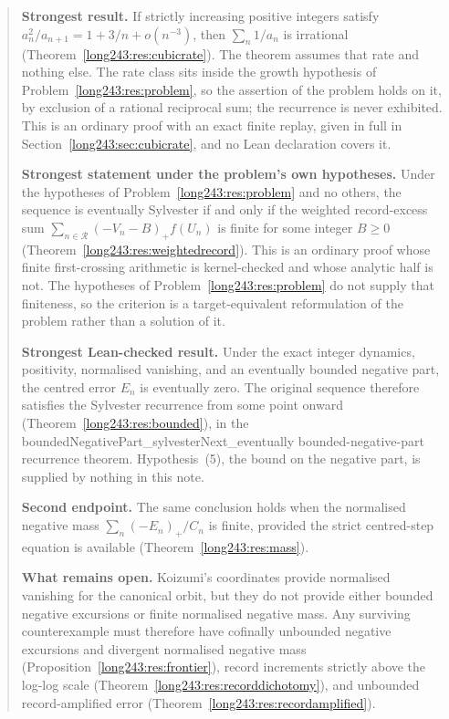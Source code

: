 \begin{quote}\small
\textbf{Strongest result.}
If strictly increasing positive integers satisfy
$a_n^2/a_{n+1}=1+3/n+o(n^{-3})$, then $\sum_n1/a_n$ is irrational
(Theorem~\ref{long243:res:cubicrate}).  The theorem assumes that rate and nothing else.
The rate class sits inside the growth hypothesis of
Problem~\ref{long243:res:problem}, so the assertion of the problem holds on it, by
exclusion of a rational reciprocal sum; the recurrence is never exhibited.
This is an ordinary proof with an exact finite replay, given in full in
Section~\ref{long243:sec:cubicrate}, and no Lean declaration covers it.

\smallskip
\textbf{Strongest statement under the problem's own hypotheses.}
Under the hypotheses of Problem~\ref{long243:res:problem} and no others, the sequence
is eventually Sylvester if and only if the weighted record-excess sum
$\sum_{n\in\mathcal R}(-V_n-B)_+f(U_n)$ is finite for some integer $B\ge0$
(Theorem~\ref{long243:res:weightedrecord}).  This is an ordinary proof whose finite
first-crossing arithmetic is kernel-checked and whose analytic half is not.
The hypotheses of Problem~\ref{long243:res:problem} do not supply that finiteness, so
the criterion is a target-equivalent reformulation of the problem rather than a
solution of it.

\smallskip
\textbf{Strongest Lean-checked result.}
Under the exact integer dynamics, positivity, normalised vanishing, and an
eventually bounded negative part, the centred error $E_n$ is eventually zero.
The original sequence therefore satisfies the Sylvester recurrence from some
point onward (Theorem~\ref{long243:res:bounded}), in the
      {boundedNegativePart_sylvesterNext_eventually}
      {bounded-negative-part recurrence theorem}.  Hypothesis~(5), the bound on
the negative part, is supplied by nothing in this note.

\smallskip
\textbf{Second endpoint.}
The same conclusion holds when the normalised negative mass
$\sum_n(-E_n)_+/C_n$ is finite, provided the strict centred-step equation is
available (Theorem~\ref{long243:res:mass}).

\smallskip
\smallskip
\textbf{What remains open.}
Koizumi's coordinates provide normalised vanishing for the canonical orbit,
but they do not provide either bounded negative excursions or finite
normalised negative mass.  Any surviving counterexample must therefore have
cofinally unbounded negative excursions and divergent normalised negative
mass (Proposition~\ref{long243:res:frontier}), record increments strictly above the
log-log scale (Theorem~\ref{long243:res:recorddichotomy}), and unbounded
record-amplified error (Theorem~\ref{long243:res:recordamplified}).


\end{quote}
